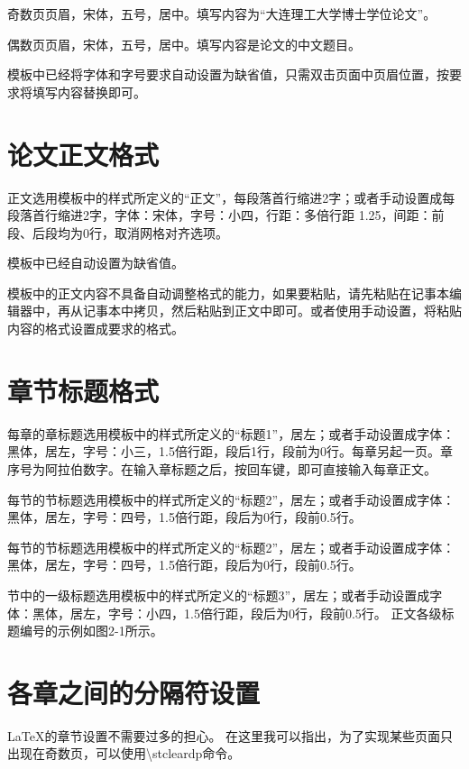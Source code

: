 奇数页页眉，宋体，五号，居中。填写内容为“大连理工大学博士学位论文”。

偶数页页眉，宋体，五号，居中。填写内容是论文的中文题目。                                                                                         

模板中已经将字体和字号要求自动设置为缺省值，只需双击页面中页眉位置，按要求将填写内容替换即可。
\section{论文正文格式}
正文选用模板中的样式所定义的“正文”，每段落首行缩进2字；或者手动设置成每段落首行缩进2字，字体：宋体，字号：小四，行距：多倍行距 1.25，间距：前段、后段均为0行，取消网格对齐选项。

模板中已经自动设置为缺省值。

模板中的正文内容不具备自动调整格式的能力，如果要粘贴，请先粘贴在记事本编辑器中，再从记事本中拷贝，然后粘贴到正文中即可。或者使用手动设置，将粘贴内容的格式设置成要求的格式。

\section{章节标题格式}
\begin{asparaenum}[(1)]
    \item 
    每章的章标题选用模板中的样式所定义的“标题1”，居左；或者手动设置成字体：黑体，居左，字号：小三，1.5倍行距，段后1行，段前为0行。每章另起一页。章序号为阿拉伯数字。在输入章标题之后，按回车键，即可直接输入每章正文。

\item
 每节的节标题选用模板中的样式所定义的“标题2”，居左；或者手动设置成字体：黑体，居左，字号：四号，1.5倍行距，段后为0行，段前0.5行。

\item 
    每节的节标题选用模板中的样式所定义的“标题2”，居左；或者手动设置成字体：黑体，居左，字号：四号，1.5倍行距，段后为0行，段前0.5行。

\item
    节中的一级标题选用模板中的样式所定义的“标题3”，居左；或者手动设置成字体：黑体，居左，字号：小四，1.5倍行距，段后为0行，段前0.5行。 正文各级标题编号的示例如图2-1所示。
\end{asparaenum}

\section{各章之间的分隔符设置}
\LaTeX 的章节设置不需要过多的担心。 在这里我可以指出，为了实现某些页面只出现在奇数页，可以使用\textbackslash stcleardp命令。

